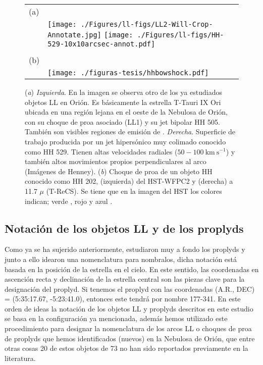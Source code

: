 \begin{figure}[htp]
\centering
\begin{tabular}{l l}
(a) & \\
 & \texttt{[image: ./Figures/ll-figs/LL2-Will-Crop-Annotate.jpg]}
\texttt{[image: ./Figures/ll-figs/HH-529-10x10arcsec-annot.pdf]}
\\
& \\[2\baselineskip]
(b) & \\
& \texttt{[image: ./figuras-tesis/hhbowshock.pdf]}
\\
\end{tabular}
\caption{(\textit{a}) \textit{Izquierda}. En la imagen se observa otro de los ya estudiados objetos LL en Orión. Es básicamente la estrella T-Tauri IX Ori ubicada en una región lejana en el oeste de la Nebulosa de Orión, con su choque de proa asociado (LL1) y su jet bipolar HH 505. También son visibles regiones de emisión de \oiii{}. \textit{Derecha}. Superficie de trabajo producida por un jet hipersónico muy colimado conocido como HH 529. Tienen altas velocidades radiales (\(50-100 ~\text{km}~\text{s}^{-1}\)) y también altos  movimientos propios perpendiculares al arco (Imágenes de Henney). (\textit{b}) Choque de proa de un objeto HH conocido como HH 202, (izquierda) del HST-WFPC2 y (derecha) a 11.7 \(\mu\) (T-ReCS). Se tiene que en la imagen del HST los colores indican; verde \ha{}, rojo \nii{} y azul \oiii{} \citep{Smith:2005}.}\label{fig:objecthh}
\end{figure}

\subsection{Notación de los objetos LL y de los proplyds}
\label{sec:notacion}

Como ya se ha sujerido anteriormente, \citet{Odell:1994} estudiaron muy a fondo los proplyds y junto a  ello idearon una nomenclatura para nombralos, dicha notación está basada en la posición de la estrella en el cielo. En este sentido, las coordenadas en ascención recta y declinación de la estrella central son las piezas clave para la designación del proplyd. Si tenemos el proplyd con las coordenadas (A.R., DEC) = (5:35:17.67, -5:23:41.0), entonces este tendrá por nombre 177-341. En este orden de ideas la notación de los objetos LL y proplyds descritos en este estudio se basa en la configuración ya mencionada, además hemos utilizado este procedimiento para designar la nomenclatura de los arcos LL o choques de proa de proplyds que hemos identificados (nuevos) en la Nebulosa de Orión, que entre otras cosas 20 de estos objetos de 73 no han sido reportados previamente en la literatura.

